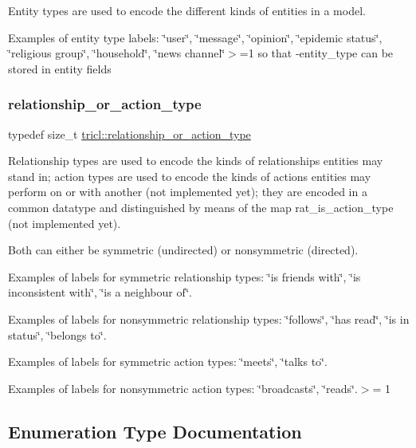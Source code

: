 Entity types are used to encode the different kinds of entities in a model. 

Examples of entity type labels\+: \char`\"{}user\char`\"{}, \char`\"{}message\char`\"{}, \char`\"{}opinion\char`\"{}, \char`\"{}epidemic status\char`\"{}, \char`\"{}religious group\char`\"{}, \char`\"{}household\char`\"{}, \char`\"{}news channel\char`\"{}$>$=1 so that -\/entity\+\_\+type can be stored in entity fields \mbox{\label{namespacetricl_a2d01894944fb58a8fedc0912a48d13f8}} 
\subsubsection{\texorpdfstring{relationship\+\_\+or\+\_\+action\+\_\+type}{relationship\_or\_action\_type}}
{\footnotesize\ttfamily typedef size\+\_\+t \hyperlink{namespacetricl_a2d01894944fb58a8fedc0912a48d13f8}{tricl\+::relationship\+\_\+or\+\_\+action\+\_\+type}}



Relationship types are used to encode the kinds of relationships entities may stand in; action types are used to encode the kinds of actions entities may perform on or with another (not implemented yet); they are encoded in a common datatype and distinguished by means of the map rat\+\_\+is\+\_\+action\+\_\+type (not implemented yet). 

Both can either be symmetric (undirected) or nonsymmetric (directed).

Examples of labels for symmetric relationship types\+: \char`\"{}is friends with\char`\"{}, \char`\"{}is inconsistent with\char`\"{}, \char`\"{}is a neighbour of\char`\"{}.

Examples of labels for nonsymmetric relationship types\+: \char`\"{}follows\char`\"{}, \char`\"{}has read\char`\"{}, \char`\"{}is in status\char`\"{}, \char`\"{}belongs to\char`\"{}.

Examples of labels for symmetric action types\+: \char`\"{}meets\char`\"{}, \char`\"{}talks to\char`\"{}.

Examples of labels for nonsymmetric action types\+: \char`\"{}broadcasts\char`\"{}, \char`\"{}reads\char`\"{}.$>$= 1 

\subsection{Enumeration Type Documentation}
\mbox{\label{namespacetricl_a6967089e2c0837f273d8cb5fd9f7e46d}} 

